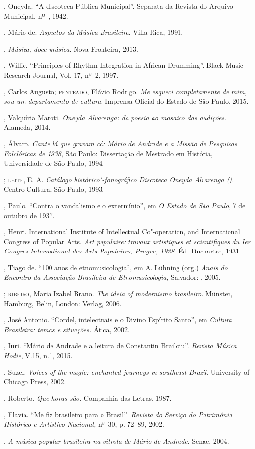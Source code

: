 \begin{bibliohedra}
, Oneyda. ``A discoteca Pública Municipal''. Separata da
Revista do Arquivo Municipal, nº~, 1942.

, Mário de. \emph{Aspectos da Música Brasileira}. Villa Rica,
1991.

\titidem. \emph{Música, doce música}. Nova Fronteira, 2013.

, Willie. ``Principles of Rhythm Integration in African Drumming''.
Black Music Research Journal, Vol. 17, nº~2, 1997.

, Carlos Augusto; \textsc{penteado}, Flávio Rodrigo. \emph{Me esqueci
completamente de mim, sou um departamento de cultura}. Imprensa Oficial
do Estado de São Paulo, 2015.

, Valquíria Maroti. \emph{Oneyda Alvarenga: da poesia ao mosaico
das audições}. Alameda, 2014.

, Álvaro. \emph{Cante lá que gravam cá: Mário de Andrade e a
Missão de Pesquisas Folclóricas de 1938}, São Paulo: Dissertação de
Mestrado em História, Universidade de São Paulo, 1994.

\titidem; \textsc{leite}, E. A. \emph{Catálogo histórico"-fonográfico
Discoteca Oneyda Alvarenga ().} Centro Cultural São Paulo, 1993.

, Paulo. ``Contra o vandalismo e o extermínio'', em \emph{O Estado
de São Paulo}, 7 de outubro de 1937.

, Henri. International Institute of Intellectual Co"-operation,
and International Congress of Popular Arts. \emph{Art populaire: travaux
artistiques et scientifiques du Ier Congres International des Arts
Populaires, Prague, 1928}. Éd. Duchartre, 1931.

, Tiago de. ``100 anos de etnomusicologia'', em A. Lühning
(org.) \emph{Anais do  Encontro da Associação Brasileira de
Etnomusicologia}, Salvador: , 2005.

\titidem; \textsc{ribeiro}, Maria Izabel Brano. \emph{The ideia of modernismo
brasileiro.} Münster, Hamburg, Belin, London:  Verlag, 2006.

, José Antonio. ``Cordel, intelectuais e o Divino Espírito
Santo'', em \emph{Cultura Brasileira: temas e situações.} Ática, 2002.

, Iuri. ``Mário de Andrade e a leitura de Constantin Brailoiu''.
\emph{Revista Música Hodie}, V.15, n.1, 2015.

, Suzel. \emph{Voices of the magic: enchanted journeys in southeast
Brazil}. University of Chicago Press, 2002.

, Roberto. \emph{Que horas são.} Companhia das Letras, 1987.

, Flavia. ``Me fiz brasileiro para o Brasil'', \emph{Revista do
Serviço do Patrimônio Histórico e Artístico Nacional,} nº~30, p. 72--89,
2002.

\titidem. \emph{A música popular brasileira na vitrola de Mário de
Andrade}. Senac, 2004.
\end{bibliohedra}